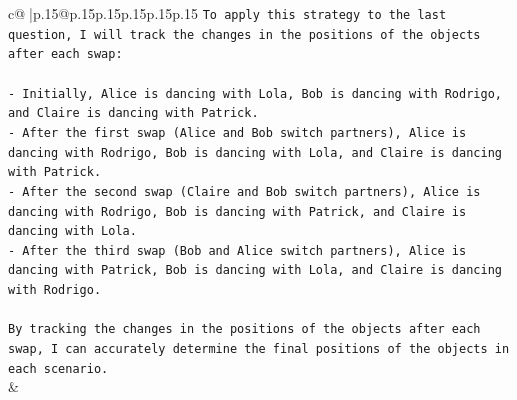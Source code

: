\documentclass{article}
\begin{document}
{\begin{supertabular}{c@{$\;$}|p{.15\linewidth}@{}p{.15\linewidth}p{.15\linewidth}p{.15\linewidth}p{.15\linewidth}p{.15\linewidth}}
{{{\texttt{To apply this strategy to the last question, I will track the changes in the positions of the objects after each swap:} \\
\\ 
\texttt{{-} Initially, Alice is dancing with Lola, Bob is dancing with Rodrigo, and Claire is dancing with Patrick.} \\
\texttt{{-} After the first swap (Alice and Bob switch partners), Alice is dancing with Rodrigo, Bob is dancing with Lola, and Claire is dancing with Patrick.} \\
\texttt{{-} After the second swap (Claire and Bob switch partners), Alice is dancing with Rodrigo, Bob is dancing with Patrick, and Claire is dancing with Lola.} \\
\texttt{{-} After the third swap (Bob and Alice switch partners), Alice is dancing with Patrick, Bob is dancing with Lola, and Claire is dancing with Rodrigo.} \\
\\ 
\texttt{By tracking the changes in the positions of the objects after each swap, I can accurately determine the final positions of the objects in each scenario.} \\
            }
        }
    }
    & \\ \\

\end{supertabular}
}
\end{document}
